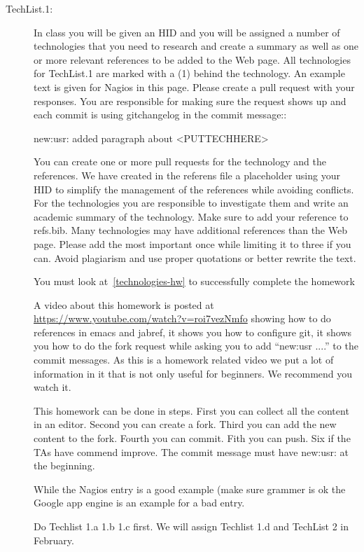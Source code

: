 \begin{description}

\item[TechList.1:] In class you will be given an HID and you will be assigned
  a number of technologies that you need to research and create a
  summary as well as one or more relevant references to be added to the
  Web page. All technologies for TechList.1 are marked with a (1)
  behind the technology.  An example text is given for Nagios in this
  page.  Please create a pull request with your responses. You are
  responsible for making sure the request shows up and each commit is
  using gitchangelog in the commit message::

    new:usr: added paragraph about <PUTTECHHERE>

  You can create one or more pull requests for the technology and the
  references. We have created in the referens file a placeholder using
  your HID to simplify the management of the references while avoiding
  conflicts.  For the technologies you are responsible to investigate
  them and write an academic summary of the technology. Make sure to
  add your reference to refs.bib.  Many technologies may have
  additional references than the Web page. Please add the most
  important once while limiting it to three if you can. Avoid
  plagiarism and use proper quotations or better rewrite the text.

  You must look at~\ref{technologies-hw} to successfully complete the
  homework

  A video about this homework is posted at
  \url{https://www.youtube.com/watch?v=roi7vezNmfo} showing how to
  do references in emacs and jabref, it shows you how to configure
  git, it shows you how to do the fork request while asking you to add
  ``new:usr ....'' to the commit messages. As this is a homework
  related video we put a lot of information in it that is not only
  useful for beginners. We recommend you watch it.


  This homework can be done in steps. First you can collect all the
  content in an editor. Second you can create a fork. Third you can
  add the new content to the fork. Fourth you can commit. Fith you
  can push. Six if the TAs have commend improve. The commit message
  must have new:usr: at the beginning.

  While the Nagios entry is a good example (make sure grammer is ok
  the Google app engine is an example for a bad entry.

  Do Techlist 1.a 1.b 1.c first. We  will assign Techlist 1.d and
  TechList 2 in February.


\end{description}
